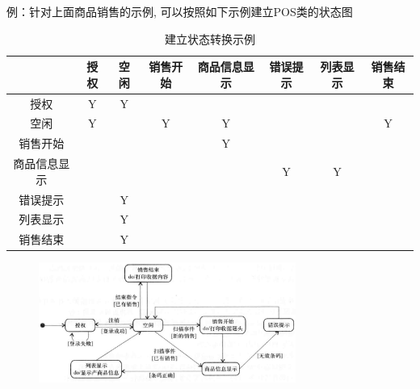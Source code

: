 例：针对上面商品销售的示例, 可以按照如下示例建立POS类的状态图
\begin{table}[H]
    \centering
    \begin{tabular}{|c|c|c|c|c|c|c|c|}
    \hline
           & 授权 & 空闲 & 销售开始 & 商品信息显示 & 错误提示 & 列表显示 & 销售结束 \\ \hline
    授权     & Y  & Y  &      &        &      &      &      \\ \hline
    空闲     & Y  &    & Y    & Y      &      &      & Y    \\ \hline
    销售开始   &    &    &      & Y      &      &      &      \\ \hline
    商品信息显示 &    &    &      &        & Y    & Y    &      \\ \hline
    错误提示   &    & Y  &      &        &      &      &      \\ \hline
    列表显示   &    & Y  &      &        &      &      &      \\ \hline
    销售结束   &    & Y  &      &        &      &      &      \\ \hline
    \end{tabular}
    \caption*{建立状态转换示例}
    \vspace{-1em}
\end{table}

\begin{figure}[H]
    \vspace{-0.2em}
	\includegraphics[width=0.75\textwidth]{img/状态图建立示例.png}
    \vspace{-1em}
\end{figure}


\setlength{\TPHorizModule}{\textwidth}
\setlength{\TPVertModule}{\textwidth}
 
